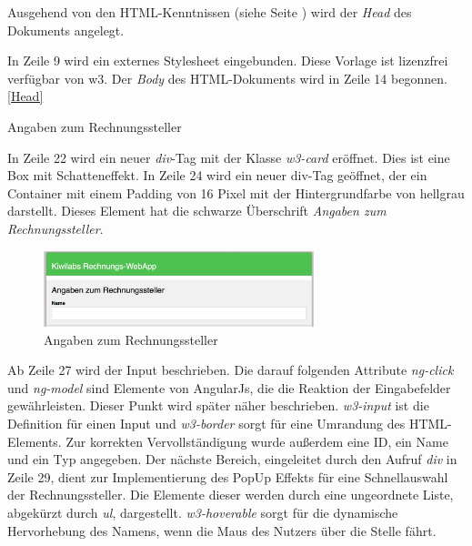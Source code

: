 %
Ausgehend von den \ac{HTML}-Kenntnissen (siehe Seite \pageref{sec:HTML}) wird der \textit{Head} des Dokuments angelegt.
 \label{Head} 

In Zeile 9 wird ein externes Stylesheet\cite{w3.css} eingebunden. Diese Vorlage ist lizenzfrei verfügbar von w3. Der \textit{Body} des HTML-Dokuments wird in Zeile 14 begonnen.\ref{Head}

\newpage
\begin{description}
	\item[Angaben zum Rechnungssteller]
    \hfill
    \label{des:Angaben_Rechnungssteller}
\end{description}
%


In Zeile 22 wird ein neuer \textit{div}-Tag mit der Klasse \textit{w3-card} eröffnet. Dies ist eine Box mit Schatteneffekt. In Zeile 24 wird ein neuer div-Tag geöffnet, der ein Container mit einem Padding von 16 Pixel mit der Hintergrundfarbe von hellgrau darstellt. Dieses Element hat die schwarze Überschrift \textit{Angaben zum Rechnungssteller}. 
\begin{figure}[H]
    \centering
    \includegraphics[width=0.7\textwidth]{imports/AzR}
    \caption{  Angaben zum Rechnungssteller}
  
\end{figure}
%
Ab Zeile 27 wird der Input beschrieben. Die darauf folgenden Attribute \textit{ng-click} und \textit{ng-model} sind Elemente von AngularJs, die die Reaktion der Eingabefelder gewährleisten. Dieser Punkt wird später näher beschrieben. \textit{w3-input} ist die Definition für einen Input und \textit{w3-border} sorgt für eine Umrandung des HTML-Elements. Zur korrekten Vervollständigung wurde außerdem eine ID, ein Name und ein Typ angegeben.
Der nächste Bereich, eingeleitet durch den Aufruf \textit{div} in Zeile 29, dient zur Implementierung des PopUp Effekts für eine Schnellauswahl der Rechnungssteller. Die Elemente dieser werden durch eine ungeordnete Liste, abgekürzt durch \textit{ul}, dargestellt. \textit{w3-hoverable} sorgt für die dynamische Hervorhebung des Namens, wenn die Maus des Nutzers über die Stelle fährt. 

